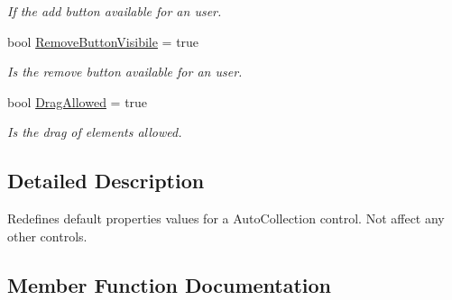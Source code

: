 \begin{DoxyCompactItemize}
\begin{DoxyCompactList}\small\item\em If the add button available for an user. \end{DoxyCompactList}\item 
bool \mbox{\hyperlink{class_wpf_handler_1_1_u_i_1_1_auto_layout_1_1_options_1_1_auto_collection_properties_attribute_a143a7de08e82032c232df0d05c2e1678}{Remove\+Button\+Visibile}} = true
\begin{DoxyCompactList}\small\item\em Is the remove button available for an user. \end{DoxyCompactList}\item 
bool \mbox{\hyperlink{class_wpf_handler_1_1_u_i_1_1_auto_layout_1_1_options_1_1_auto_collection_properties_attribute_af5ff32848512ac0fb040b7e0d6311c0e}{Drag\+Allowed}} = true
\begin{DoxyCompactList}\small\item\em Is the drag of elements allowed. \end{DoxyCompactList}\end{DoxyCompactItemize}


\subsection{Detailed Description}
Redefines default properties values for a Auto\+Collection control. Not affect any other controls. 



\subsection{Member Function Documentation}
\mbox{\label{class_wpf_handler_1_1_u_i_1_1_auto_layout_1_1_options_1_1_auto_collection_properties_attribute_aaff2195c793c7e75ac553291d9189655}} 
